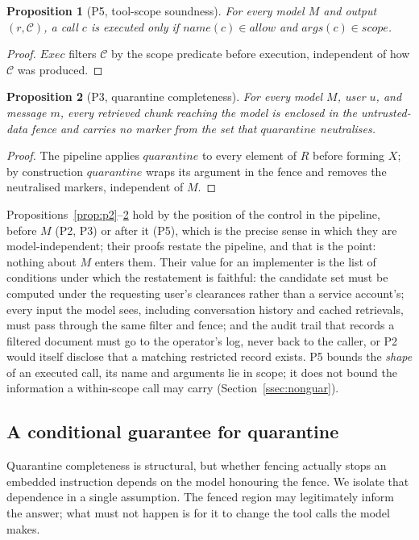 \documentclass[conference]{IEEEtran}
\newtheorem{proposition}{Proposition}
\begin{document}
\begin{proposition}[P5, tool-scope soundness]
\label{prop:p5}
For every model $M$ and output $(r,\mathcal{C})$, a call $c$ is executed only if
$\mathit{name}(c)\in\mathit{allow}$ and $\mathit{args}(c)\in\mathit{scope}$.
\end{proposition}
\begin{proof}
$\mathit{Exec}$ filters $\mathcal{C}$ by the scope predicate before execution,
independent of how $\mathcal{C}$ was produced.
\end{proof}

\begin{proposition}[P3, quarantine completeness]
\label{prop:p3c}
For every model $M$, user $u$, and message $m$, every retrieved chunk reaching the
model is enclosed in the untrusted-data fence and carries no marker from the set
that $\mathit{quarantine}$ neutralises.
\end{proposition}
\begin{proof}
The pipeline applies $\mathit{quarantine}$ to every element of $R$ before forming
$X$; by construction $\mathit{quarantine}$ wraps its argument in the fence and
removes the neutralised markers, independent of $M$.
\end{proof}

Propositions~\ref{prop:p2}--\ref{prop:p3c} hold by the position of the control in
the pipeline, before $M$ (P2, P3) or after it (P5), which is the precise sense in
which they are model-independent; their proofs restate the pipeline, and that is the
point: nothing about $M$ enters them. Their value for an implementer is the list of
conditions under which the restatement is faithful: the candidate set must be
computed under the requesting user's clearances rather than a service account's;
every input the model sees, including conversation history and cached retrievals,
must pass through the same filter and fence; and the audit trail that records a
filtered document must go to the operator's log, never back to the caller, or P2
would itself disclose that a matching restricted record exists. P5 bounds the
\emph{shape} of an executed call, its name and arguments lie in scope; it does not
bound the information a within-scope call may carry (Section~\ref{ssec:nonguar}).

\subsection{A conditional guarantee for quarantine}

Quarantine completeness is structural, but whether fencing actually stops an
embedded instruction depends on the model honouring the fence. We isolate that
dependence in a single assumption. The fenced region may legitimately inform the
answer; what must not happen is for it to change the tool calls the model makes.
\end{document}
